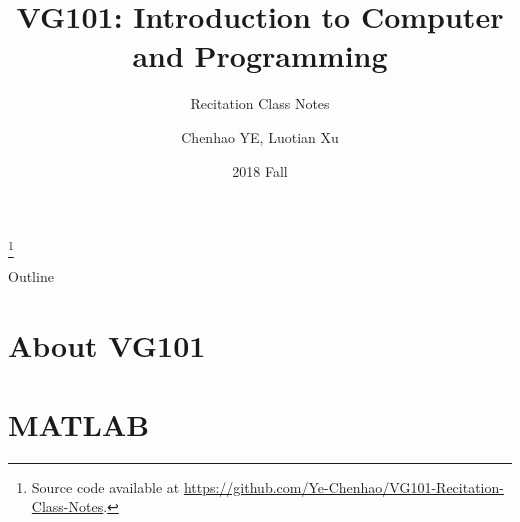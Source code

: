 \documentclass{beamer}
\title[VG101 Recitation Class Notes]{VG101: Introduction to Computer and Programming}
\author{Chenhao YE, Luotian Xu}
\date{2018 Fall}
\institute[UM-SJTU JI]{VG101 TA Group, UM-SJTU Joint Institute}
\subtitle{Recitation Class Notes}
\begin{document}
\begin{frame}
  \titlepage
  \renewcommand{\thefootnote}{}
  \footnote{Source code available at \url{https://github.com/Ye-Chenhao/VG101-Recitation-Class-Notes}.}\setcounter{footnote}{0}
\end{frame}

\begin{frame}{Outline}
  \tableofcontents
\end{frame}


\section{About VG101}


\section{MATLAB}

\end{document}
